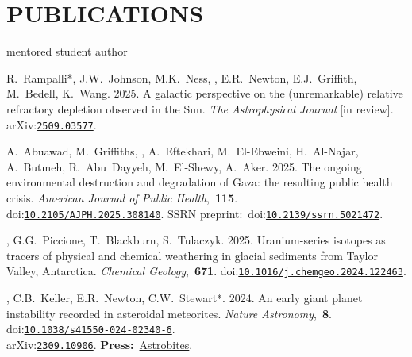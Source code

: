 \section{PUBLICATIONS}
\hfill* mentored student author
\newcommand{\inprep}[1]{\textit{#1} [in prep.]}
\newcommand{\submitted}[1]{\textit{#1} [submitted]}
\newcommand{\inreview}[1]{\textit{#1} [in review]}
\newcommand{\inpress}[1]{\textit{#1} [in press]}
\newcommand{\doi}[1]{doi:\href{https://doi.org/#1}{\texttt{#1}}}
\newcommand{\arxiv}[1]{arXiv:\href{https://arxiv.org/abs/#1}{\texttt{#1}}}
\newcommand{\press}[2]{\textbf{Press:}~\href{#1}{#2}}
\newcommand{\pub}[2]{\textit{#1},~\textbf{#2}}

\begin{etaremune} [itemsep=4pt, leftmargin=3ex]
    \item R.~Rampalli*, J.W.~Johnson, M.K.~Ness, \ghedwards, E.R.~Newton, E.J.~Griffith, M.~Bedell, K.~Wang. 2025. A galactic perspective on the (unremarkable) relative refractory depletion observed in the Sun. \inreview{The Astrophysical Journal}. \arxiv{2509.03577}.

    \item A.~Abuawad, M.~Griffiths, \ghedwards, A.~Eftekhari, M.~El-Ebweini, H.~Al-Najar, A.~Butmeh, R.~Abu~Dayyeh, M.~El-Shewy, A.~Aker. 2025. The ongoing environmental destruction and degradation of Gaza: the resulting public health crisis. \pub{American Journal of Public Health}{115}. \\\doi{10.2105/AJPH.2025.308140}. SSRN preprint:~\doi{10.2139/ssrn.5021472}.
 
    \item \ghedwards, G.G.~Piccione, T.~Blackburn,  S.~Tulaczyk. 2025. Uranium-series isotopes as tracers of physical and chemical weathering in glacial sediments from Taylor Valley, Antarctica. \pub{Chemical Geology}{671}. \doi{10.1016/j.chemgeo.2024.122463}.
        
    \item \ghedwards, C.B.~Keller, E.R.~Newton, C.W.~Stewart*. 2024. An early giant planet instability recorded in asteroidal meteorites. \pub{Nature Astronomy}{8}. \doi{10.1038/s41550-024-02340-6}. \\\arxiv{2309.10906}. \press{https://astrobites.org/2023/09/25/meteorites-planet-migration/}{Astrobites}.
    

\end{etaremune}

